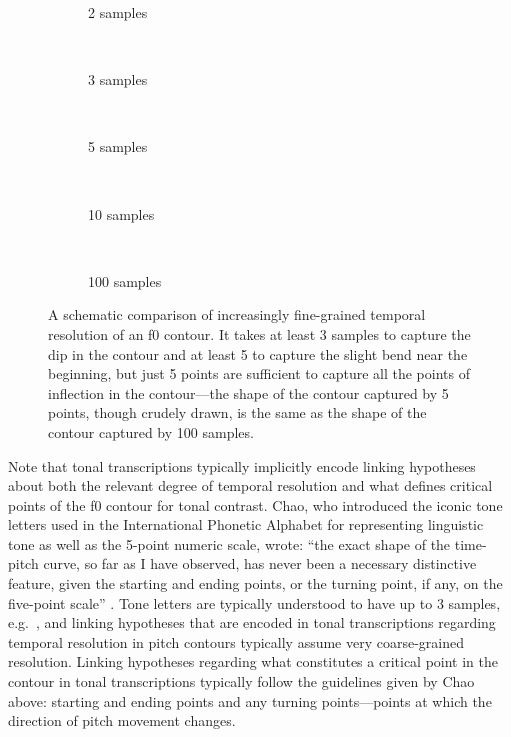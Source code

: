 \documentclass[12pt]{article}
\let\ipa\textipa
\begin{document}
\begin{figure}
  \centering
\begin{subfigure}[t]{0.3\textwidth}
  \centering
  \caption{2 samples}
  \label{fig:samp-2}
\end{subfigure}
~
\begin{subfigure}[t]{0.3\textwidth}
  \centering
  \caption{3 samples}
  \label{fig:samp-3}
\end{subfigure}
~
\begin{subfigure}[t]{0.3\textwidth}
  \centering
  \caption{5 samples}
  \label{fig:samp-5}
\end{subfigure}
~
\begin{subfigure}[t]{0.3\textwidth}
  \centering
  \caption{10 samples}
  \label{fig:samp-10}
\end{subfigure}
~
\begin{subfigure}[t]{0.3\textwidth}
  \centering
  \caption{100 samples}
  \label{fig:samp-100}
\end{subfigure}
  \caption{A schematic comparison of increasingly fine-grained
    temporal resolution of an f0 contour. It takes at least 3 samples to
    capture the dip in the contour and at least 5 to capture the
    slight bend near the beginning, but just 5 points are sufficient
    to capture all the points of inflection in the contour---the shape
    of the contour captured by 5 points, though crudely drawn, is the
    same as the shape of the contour captured by 100 samples.}\label{fig:resolution}
\end{figure}

Note that tonal transcriptions typically implicitly encode linking
hypotheses about both the relevant degree of temporal resolution and
what defines critical points of the f0 contour for tonal
contrast. Chao, who introduced the iconic tone letters
\citep{Chao:1930} used in the International Phonetic Alphabet for
representing linguistic tone as well as the 5-point numeric scale,
wrote: ``the exact shape of the time-pitch curve, so far as I have
observed, has never been a necessary distinctive feature, given the
starting and ending points, or the turning point, if any, on the
five-point scale'' \citep[25]{Chao:1968}. Tone letters are typically
understood to have up to 3 samples, e.g.\ \ipa{\tone{213}}, and
linking hypotheses that are encoded in tonal transcriptions regarding
temporal resolution in pitch contours typically assume very
coarse-grained resolution. Linking hypotheses regarding what
constitutes a critical point in the contour in tonal transcriptions
typically follow the guidelines given by Chao above: starting and
ending points and any turning points---points at which the direction
of pitch movement changes.
\end{document}
